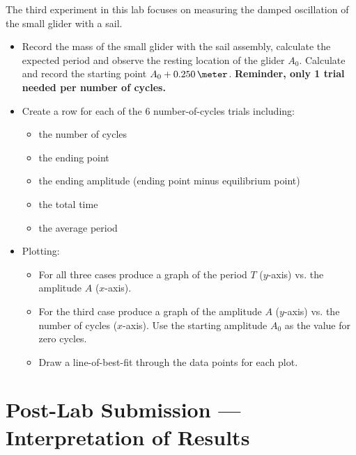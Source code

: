 The third experiment in this lab focuses on measuring the damped oscillation of the small glider with a sail.
\begin{itemize}
\item Record the mass of the small glider with the sail assembly, calculate the expected period and observe the resting location of the glider $A_0$. Calculate and record the starting point $A_0 + 0.250\,\meter$. \textbf{Reminder, only 1 trial needed per number of cycles.}
\item Create a row for each of the 6 number-of-cycles trials including:
  \begin{itemize}
  \item the number of cycles
  \item the ending point
  \item the ending amplitude (ending point minus equilibrium point)
  \item the total time
  \item the average period
  \end{itemize}


\item Plotting:
\begin{itemize}
    \item For all three cases produce a graph of the period $T$ ($y$-axis) vs. the amplitude $A$ ($x$-axis).
    \item For the third case produce a graph of the amplitude $A$ ($y$-axis) vs. the number of cycles ($x$-axis). Use the starting amplitude $A_0$ as the value for zero cycles.
    \item Draw a line-of-best-fit through the data points for each plot.
\end{itemize}

\end{itemize}



\pagebreak


\section{Post-Lab Submission --- Interpretation of Results}

